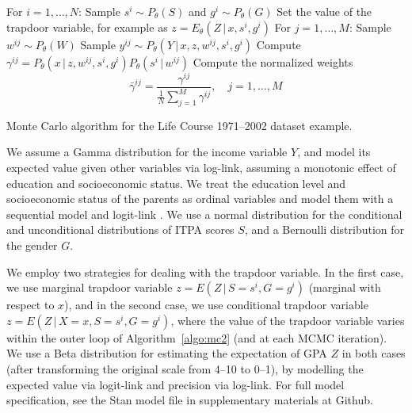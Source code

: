 \documentclass{statsoc}
\newcommand{\+}[1]{\ensuremath{\mathbf{#1}}}
\newcommand{\given}{{ \, | \, }}
\newcommand{\z}{trapdoor variable}
\begin{document}
\begin{algorithm}[!t]
  \begin{algorithmic}[1]
  \State For $i = 1,\ldots,N$:
    \State \quad Sample $s^i \sim P_\theta(S)$ and $g^i \sim P_\theta(G)$
    \State \quad Set the value of the \z, for example as $z = E_\theta(Z \given x, s^i, g^i)$
    \State \quad For $j = 1, \ldots, M$:
      \State \quad \quad Sample $w^{ij} \sim P_\theta(W)$
      \State \quad \quad Sample $y^{ij} \sim P_\theta(Y \given  x, z, w^{ij}, s^i, g^i)$
      \State \quad \quad Compute $\gamma^{ij} =  P_\theta(x \given  z, w^{ij}, s^i, g^i) P_\theta(s^i \given  w^{ij})$
    \State \quad Compute the normalized weights
    \[
    \bar \gamma^{ij} = \frac{\gamma^{ij}}{\frac{1}{N}\sum_{j=1}^M \gamma^{ij}}, \quad j = 1, \ldots, M
    \]
  \end{algorithmic}
  \caption{Monte Carlo algorithm for the Life Course 1971--2002 dataset example.}
  \label{algo:mc2}
\end{algorithm}

We assume a Gamma distribution for the income variable $Y$, and model its expected value given other variables via log-link, assuming a monotonic effect \citep{burkner2018} of education and socioeconomic status. We treat the education level and socioeconomic status of the parents as ordinal variables and model them with a sequential model and logit-link \citep{Tutz1990, burkner2019}. We use a normal distribution for the conditional and unconditional distributions of ITPA scores $S$, and a Bernoulli distribution for the gender $G$. 

We employ two strategies for dealing with the trapdoor variable. In the first case, we use marginal trapdoor variable $z = E(Z \given S = s^i, G = g^i)$ (marginal with respect to $x$), and in the second case, we use conditional trapdoor variable $z = E(Z \given X = x, S = s^i, G = g^i)$, where the value of the trapdoor variable varies within the outer loop of Algorithm~\ref{algo:mc2} (and at each MCMC iteration). We use a Beta distribution for estimating the expectation of GPA $Z$ in both cases (after transforming the original scale from 4--10 to 0--1), by modelling the expected value via logit-link and precision via log-link. For full model specification, see the Stan model file in supplementary materials at Github.
\end{document}
